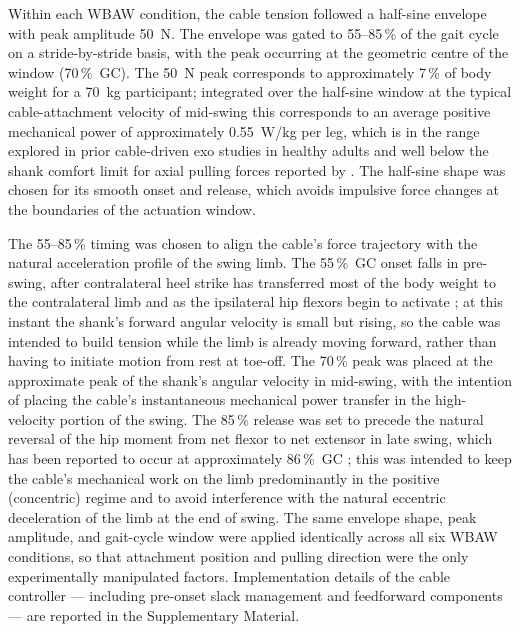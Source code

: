 \documentclass[11pt,a4paper]{article}
\begin{document}
Within each WBAW condition, the cable tension followed a half-sine envelope with peak amplitude 50~N. The envelope was gated to 55--85\,\% of the gait cycle on a stride-by-stride basis, with the peak occurring at the geometric centre of the window (70\,\%~GC). The 50~N peak corresponds to approximately 7\,\% of body weight for a 70~kg participant; integrated over the half-sine window at the typical cable-attachment velocity of mid-swing this corresponds to an average positive mechanical power of approximately 0.55~W/kg per leg, which is in the range explored in prior cable-driven exo studies in healthy adults \citep{galle2017,quinlivan2017} and well below the shank comfort limit for axial pulling forces reported by \citet{yandell2020}. The half-sine shape was chosen for its smooth onset and release, which avoids impulsive force changes at the boundaries of the actuation window.

The 55--85\,\% timing was chosen to align the cable's force trajectory with the natural acceleration profile of the swing limb. The 55\,\%~GC onset falls in pre-swing, after contralateral heel strike has transferred most of the body weight to the contralateral limb and as the ipsilateral hip flexors begin to activate \citep{perryburnfield2010}; at this instant the shank's forward angular velocity is small but rising, so the cable was intended to build tension while the limb is already moving forward, rather than having to initiate motion from rest at toe-off. The 70\,\% peak was placed at the approximate peak of the shank's angular velocity in mid-swing, with the intention of placing the cable's instantaneous mechanical power transfer in the high-velocity portion of the swing. The 85\,\% release was set to precede the natural reversal of the hip moment from net flexor to net extensor in late swing, which has been reported to occur at approximately 86\,\%~GC \citep{winter2009}; this was intended to keep the cable's mechanical work on the limb predominantly in the positive (concentric) regime and to avoid interference with the natural eccentric deceleration of the limb at the end of swing. The same envelope shape, peak amplitude, and gait-cycle window were applied identically across all six WBAW conditions, so that attachment position and pulling direction were the only experimentally manipulated factors. Implementation details of the cable controller — including pre-onset slack management and feedforward components — are reported in the Supplementary Material.
\end{document}
